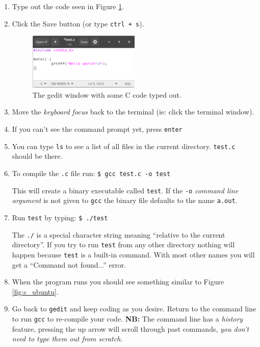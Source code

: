 \documentclass{lab}
\begin{document}
\begin{enumerate}
\item Type out the code seen in Figure \ref{fig:gedit}.

\item Click the Save button (or type \texttt{ctrl + s}).

\begin{figure}[H]
\begin{center}
\includegraphics[width=0.5\textwidth]{Wk1Images/gedit.png}
\end{center}
\caption{The gedit window with some C code typed out.}\label{fig:gedit}
\end{figure}

\item Move the \textit{keyboard focus} back to the terminal (ie: click the terminal window).

\item If you can't see the command prompt yet, press \texttt{enter}

\item You can type \texttt{ls} to see a list of all files in the current directory. \texttt{test.c} should be there.

\item To compile the \texttt{.c} file run: \texttt{\$ gcc test.c -o test}

This will create a binary executable called \texttt{test}. If the \texttt{-o} \textit{command line argument} is not given to \texttt{gcc} the binary file defaults to the name \texttt{a.out}.

\item Run \texttt{test} by typing: \texttt{\$ ./test}

The \texttt{./} is a special character string meaning ``relative to the current directory''. If you try to run \texttt{test} from any other directory nothing will happen because \texttt{test} is a built-in command. With most other names you will get a ``Command not found...'' error.

\item When the program runs you should see something similar to Figure \ref{fig:c_ubuntu}.

\item Go back to \texttt{gedit} and keep coding as you desire. Return to the command line to run \texttt{gcc} to re-compile your code. \textbf{NB:} The command line has a \textit{history} feature, pressing the up arrow will scroll through past commands, \textit{you don't need to type them out from scratch}.


\end{enumerate}
\end{document}
